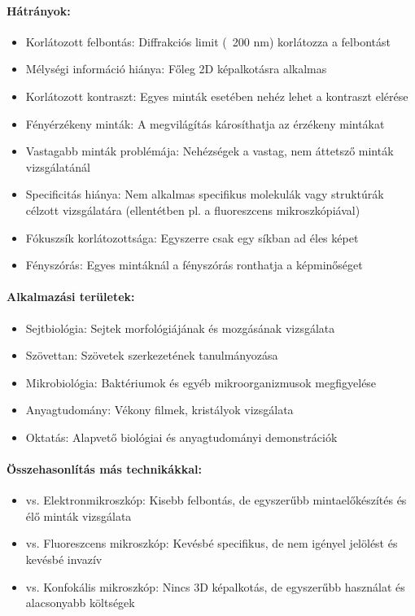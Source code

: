 \documentclass[a4paper,12pt]{article}
\begin{document}
\paragraph{Hátrányok:} \begin{itemize} \item Korlátozott felbontás: Diffrakciós limit (~200 nm) korlátozza a felbontást \item Mélységi információ hiánya: Főleg 2D képalkotásra alkalmas \item Korlátozott kontraszt: Egyes minták esetében nehéz lehet a kontraszt elérése \item Fényérzékeny minták: A megvilágítás károsíthatja az érzékeny mintákat \item Vastagabb minták problémája: Nehézségek a vastag, nem áttetsző minták vizsgálatánál \item Specificitás hiánya: Nem alkalmas specifikus molekulák vagy struktúrák célzott vizsgálatára (ellentétben pl. a fluoreszcens mikroszkópiával) \item Fókuszsík korlátozottsága: Egyszerre csak egy síkban ad éles képet \item Fényszórás: Egyes mintáknál a fényszórás ronthatja a képminőséget \end{itemize}

\paragraph{Alkalmazási területek:} \begin{itemize} \item Sejtbiológia: Sejtek morfológiájának és mozgásának vizsgálata \item Szövettan: Szövetek szerkezetének tanulmányozása \item Mikrobiológia: Baktériumok és egyéb mikroorganizmusok megfigyelése \item Anyagtudomány: Vékony filmek, kristályok vizsgálata \item Oktatás: Alapvető biológiai és anyagtudományi demonstrációk \end{itemize}

\paragraph{Összehasonlítás más technikákkal:} \begin{itemize} \item vs. Elektronmikroszkóp: Kisebb felbontás, de egyszerűbb mintaelőkészítés és élő minták vizsgálata \item vs. Fluoreszcens mikroszkóp: Kevésbé specifikus, de nem igényel jelölést és kevésbé invazív \item vs. Konfokális mikroszkóp: Nincs 3D képalkotás, de egyszerűbb használat és alacsonyabb költségek \end{itemize}
\end{document}
